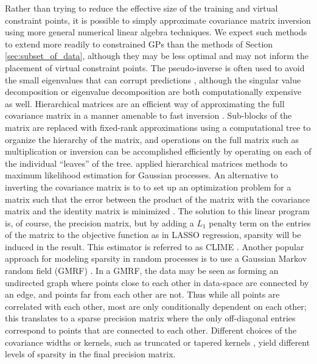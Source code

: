 \label{sec:hierarchical_matrices}
Rather than trying to reduce the effective size of the training and virtual constraint points, it is possible to simply approximate covariance matrix inversion using more general numerical linear algebra techniques.
We expect such methods to extend more readily to constrained GPs than the methods of Section \ref{sec:subset_of_data}, although they may be less optimal and may not inform the placement of virtual constraint points. 
The pseudo-inverse is often used to avoid the small eigenvalues that can corrupt predictions , although the singular value decomposition or eigenvalue decomposition are both computationally expensive as well.
Hierarchical matrices are an efficient way of approximating the full covariance matrix in a manner amenable to fast inversion . Sub-blocks of the matrix are replaced with fixed-rank approximations using a computational tree to organize the hierarchy of the matrix, and operations on the full matrix such as multiplication or inversion can be accomplished efficiently by operating on each of the individual ``leaves'' of the tree.  applied hierarchical matrices methods to maximum likelihood estimation for Gaussian processes. 
An alternative to inverting the covariance matrix is to
to set up an optimization problem for a matrix such that the error between the product of the matrix with the covariance matrix and the identity matrix is minimized . The solution to this linear program is, of course, the precision matrix,
but by adding a $L_1$ penalty term on the entries of the matrix to the objective function as in LASSO regression, sparsity will be induced in the result. This estimator is referred to as CLIME .
Another popular approach for modeling sparsity in random processes is to use a Gaussian Markov random field (GMRF) . In a GMRF, the data may be seen as forming an undirected graph where points close to each other in data-space are connected by an edge, and points far from each other are not. Thus while all points are correlated with each other, most are only conditionally dependent on each other; this translates to a sparse precision matrix where the only off-diagonal entries correspond to points that are connected to each other. Different choices of the covariance widths or kernels, such as truncated or tapered kernels , yield different levels of sparsity in the final precision matrix.

